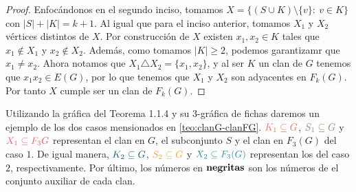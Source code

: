 \begin{proof}
        Enfoc\'andonos en el segundo inciso, tomamos $X = \{(S\cup K) \setminus
        \{v\}\colon\ v \in K \}$ con $|S| + |K| = k+1$. Al igual que para el inciso
        anterior, tomamos $X_1$ y $X_2$ v\'ertices distintos de $X$. Por
        construcci\'on de $X$ existen $x_1, x_2 \in K$ tales que $x_1 \notin
        X_1$ y $x_2 \notin X_2$. Adem\'as, como tomamos $|K| \geq 2$, podemos
        garantizamr que $x_1 \neq x_2$. Ahora notamos que $X_1 \triangle X_2 =
        \{x_1, x_2\}$, y al ser $K$ un clan de $G$ tenemos que $x_1x_2 \in
        E(G)$, por lo que tenemos que $X_1$ y $X_2$ son adyacentes en $F_k(G)$.
        Por tanto $X$ cumple ser un clan de $F_k(G)$.
    \end{proof}
    
    Utilizando la gr\'afica del Teorema 1.1.4 y su $3$-gr\'afica de fichas
    daremos un ejemplo de los dos casos mensionados en \cref{teo:clanG-clanFG}.
    ${\color{salmon}K_1 \subseteq G}$, ${\color{baige}S_1\subseteq G}$ y
    ${\color{rosa}X_1\subseteq F_3{G}}$ representan el clan en $G$, el
    subconjunto $S$ y el clan en $F_3(G)$ del caso $1$. De igual manera,
    ${\color{azulOscuro}K_2\subseteq G}$, ${\color{amarilloOscuro}S_2\subseteq
    G}$ y ${\color{azulMetal}X_2 \subseteq F_3(G)}$ representan los del caso
    $2$, respectivamente. Por \'ultimo, los n\'umeros en ${\bf negritas}$ son
    los n\'umeros de el conjunto auxiliar de cada clan.

